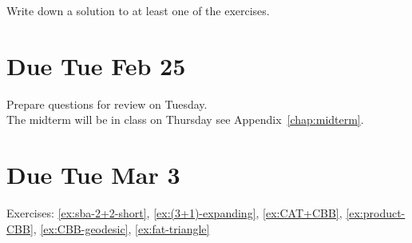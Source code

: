 \noindent Write down a solution to at least one of the exercises.

\section{Due Tue Feb 25}

Prepare questions for review on Tuesday.
\\
The midterm will be in class on Thursday see Appendix~\ref{chap:midterm}.

\section{Due Tue Mar 3}

Exercises: \ref{ex:sba-2+2-short}, \ref{ex:(3+1)-expanding}, \ref{ex:CAT+CBB}, \ref{ex:product-CBB}, \ref{ex:CBB-geodesic}, \ref{ex:fat-triangle}


